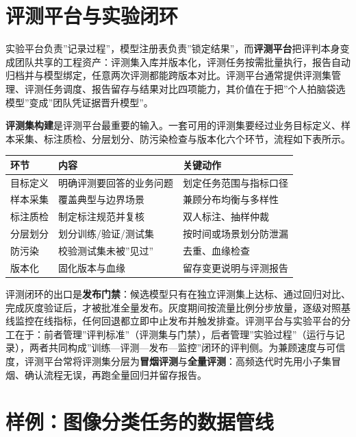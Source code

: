 \documentclass[
]{ctexbook}
\newcounter{none}
\begin{document}
\section{评测平台与实验闭环}\label{ux8bc4ux6d4bux5e73ux53f0ux4e0eux5b9eux9a8cux95edux73af}

实验平台负责''记录过程''，模型注册表负责''锁定结果''，而\textbf{评测平台}把评判本身变成团队共享的工程资产：评测集入库并版本化，评测任务按需批量执行，报告自动归档并与模型绑定，任意两次评测都能跨版本对比。评测平台通常提供评测集管理、评测任务调度、报告留存与结果对比四项能力，其价值在于把''个人拍脑袋选模型''变成''团队凭证据晋升模型''。

\textbf{评测集构建}是评测平台最重要的输入。一套可用的评测集要经过业务目标定义、样本采集、标注质检、分层划分、防污染检查与版本化六个环节，流程如下表所示。

{\def\LTcaptype{none} %
\begin{longtable}[]{@{}lll@{}}
\toprule\noalign{}
环节 & 内容 & 关键动作 \\
\midrule\noalign{}
\endhead
\bottomrule\noalign{}
\endlastfoot
目标定义 & 明确评测要回答的业务问题 & 划定任务范围与指标口径 \\
样本采集 & 覆盖典型与边界场景 & 兼顾分布均衡与多样性 \\
标注质检 & 制定标注规范并复核 & 双人标注、抽样仲裁 \\
分层划分 & 划分训练/验证/测试集 & 按时间或场景划分防泄漏 \\
防污染 & 校验测试集未被''见过'' & 去重、血缘检查 \\
版本化 & 固化版本与血缘 & 留存变更说明与评测报告 \\
\end{longtable}
}

评测闭环的出口是\textbf{发布门禁}：候选模型只有在独立评测集上达标、通过回归对比、完成灰度验证后，才被批准全量发布。灰度期间按流量比例分步放量，逐级对照基线监控在线指标，任何回退都立即中止发布并触发排查。评测平台与实验平台的分工在于：前者管理''评判标准''（评测集与门禁），后者管理''实验过程''（运行与记录），两者共同构成''训练---评测---发布---监控''闭环的评判侧。为兼顾速度与可信度，评测平台常将评测集分层为\textbf{冒烟评测}与\textbf{全量评测}：高频迭代时先用小子集冒烟、确认流程无误，再跑全量回归并留存报告。

\section{样例：图像分类任务的数据管线}\label{ux6837ux4f8bux56feux50cfux5206ux7c7bux4efbux52a1ux7684ux6570ux636eux7ba1ux7ebf}
\end{document}
